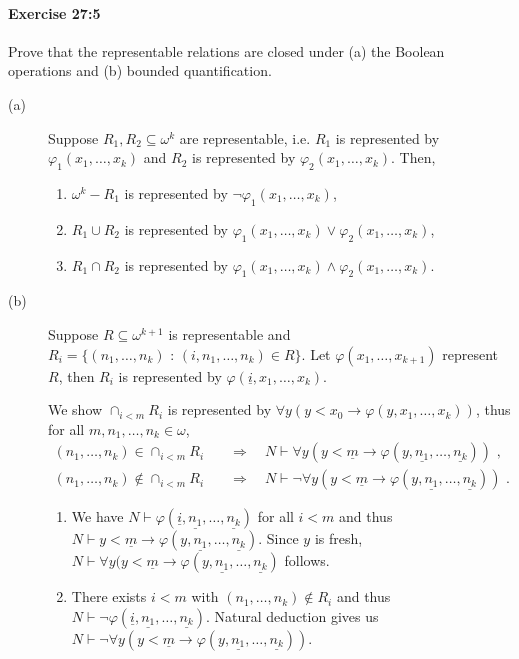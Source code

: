 \documentclass[a4paper,11pt]{article}
\begin{document}
\begin{description}
\end{description}

\paragraph{Exercise 27:5}

Prove that the representable relations are closed under (a) the Boolean operations and (b) bounded quantification.

\begin{description}

\item[(a)]
Suppose $R_1, R_2 \subseteq \omega^k$ are representable, i.e. $R_1$ is represented
by $\varphi_1(x_1, \ldots, x_k)$ and $R_2$ is represented by $\varphi_2(x_1, \ldots, x_k)$.
Then,
\begin{enumerate}[label=(\roman*)]
  \item $\omega^k - R_1$ is represented by $\neg \varphi_1(x_1, \ldots, x_k)$,
  \item $R_1 \cup R_2$ is represented by $\varphi_1(x_1, \ldots, x_k) \vee \varphi_2(x_1, \ldots, x_k)$,
  \item $R_1 \cap R_2$ is represented by $\varphi_1(x_1, \ldots, x_k) \wedge \varphi_2(x_1, \ldots, x_k)$.
\end{enumerate}

\item[(b)]
Suppose $R \subseteq \omega^{k+1}$ is representable and
$R_i = \{(n_1, \ldots, n_k) \text{ : } (i, n_1, \ldots, n_k) \in R\}$.
Let $\varphi(x_1, \ldots, x_{k+1})$ represent $R$, then $R_i$ is represented
by $\varphi(\underline{i}, x_1, \ldots, x_k)$.

We show $\cap_{i < m}R_i$ is represented by $\forall y (y\!<\!x_0 \rightarrow \varphi(y, x_1, \ldots, x_k))$,
thus for all $m, n_1, \ldots, n_k \in \omega$,
\begin{align*}
  (n_1, \ldots, n_k) \in \cap_{i < m}R_i \quad &\Rightarrow \quad N \vdash \forall y (y\!<\!\underline{m} \rightarrow \varphi(y, \underline{n_1}, \ldots, \underline{n_k})) \text{ ,} \tag{i} \\
  (n_1, \ldots, n_k) \notin \cap_{i < m}R_i \quad &\Rightarrow \quad N \vdash \neg \forall y (y\!<\!\underline{m} \rightarrow \varphi(y, \underline{n_1}, \ldots, \underline{n_k})) \text{ .} \tag{ii}
\end{align*}
\begin{enumerate}[label=(\roman*)]
\item We have $N \vdash \varphi(\underline{i}, \underline{n_1}, \ldots, \underline{n_k})$ for all $i < m$
  and thus $N \vdash y\!<\!\underline{m} \rightarrow \varphi(y, \underline{n_1}, \ldots, \underline{n_k})$.
  Since $y$ is fresh, $N \vdash \forall y (y\!<\!\underline{m} \rightarrow \varphi(y, \underline{n_1}, \ldots, \underline{n_k})$ follows.
\item There exists $i<m$ with $(n_1, \ldots, n_k) \notin R_i$ and thus
  $N \vdash \neg \varphi(\underline{i}, \underline{n_1}, \ldots, \underline{n_k})$. Natural deduction
  gives us $N \vdash \neg \forall y (y\!<\!\underline{m} \rightarrow \varphi(y, \underline{n_1}, \ldots, \underline{n_k}))$.
\end{enumerate}


\end{description}
\end{document}
